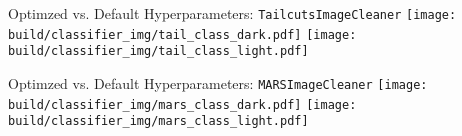 




\begin{frame}{Optimzed vs. Default Hyperparameters: \texttt{TailcutsImageCleaner}}
    {%
    \centering
    \texttt{[image: build/classifier\_img/tail\_class\_dark.pdf]}
    }
    {%
    \centering
    \texttt{[image: build/classifier\_img/tail\_class\_light.pdf]}
    }
\end{frame}

\begin{frame}{Optimzed vs. Default Hyperparameters: \texttt{MARSImageCleaner}}
    {%
    \centering
    \texttt{[image: build/classifier\_img/mars\_class\_dark.pdf]}
    }
    {%
    \centering
    \texttt{[image: build/classifier\_img/mars\_class\_light.pdf]}
    }
\end{frame}

